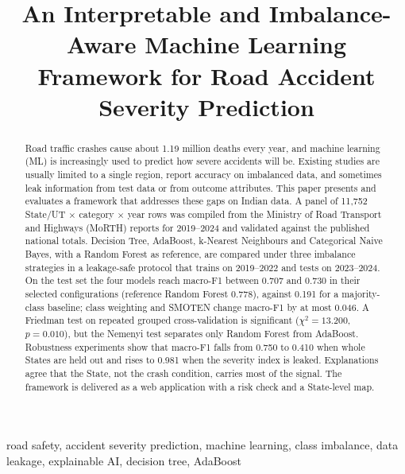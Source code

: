 \documentclass[conference]{IEEEtran}
\begin{document}
\title{An Interpretable and Imbalance-Aware Machine Learning Framework for Road Accident Severity Prediction}

\author{
}

\maketitle

\begin{abstract}
Road traffic crashes cause about 1.19 million deaths every year, and machine learning (ML) is increasingly used to predict how severe accidents will be. Existing studies are usually limited to a single region, report accuracy on imbalanced data, and sometimes leak information from test data or from outcome attributes. This paper presents and evaluates a framework that addresses these gaps on Indian data. A panel of 11,752 State/UT $\times$ category $\times$ year rows was compiled from the Ministry of Road Transport and Highways (MoRTH) reports for 2019--2024 and validated against the published national totals. Decision Tree, AdaBoost, k-Nearest Neighbours and Categorical Naive Bayes, with a Random Forest as reference, are compared under three imbalance strategies in a leakage-safe protocol that trains on 2019--2022 and tests on 2023--2024. On the test set the four models reach macro-F1 between 0.707 and 0.730 in their selected configurations (reference Random Forest 0.778), against 0.191 for a majority-class baseline; class weighting and SMOTEN change macro-F1 by at most 0.046. A Friedman test on repeated grouped cross-validation is significant ($\chi^2 = 13.200$, $p = 0.010$), but the Nemenyi test separates only Random Forest from AdaBoost. Robustness experiments show that macro-F1 falls from 0.750 to 0.410 when whole States are held out and rises to 0.981 when the severity index is leaked. Explanations agree that the State, not the crash condition, carries most of the signal. The framework is delivered as a web application with a risk check and a State-level map.
\end{abstract}

\begin{IEEEkeywords}
road safety, accident severity prediction, machine learning, class imbalance, data leakage, explainable AI, decision tree, AdaBoost
\end{IEEEkeywords}
\end{document}
